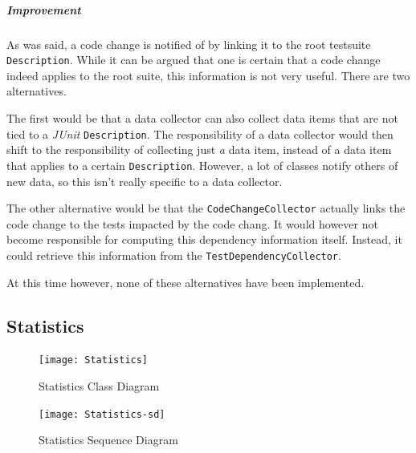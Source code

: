 \documentclass[i2]{oss}
\newcommand{\class}[1]{\texttt{#1}}
\newcommand{\junit}{\emph{JUnit }}
\begin{document}

\subparagraph{Improvement} 

As was said, a code change is notified of by linking it to the root testsuite \class{Description}.
While it can be argued that one is certain that a code change indeed applies to the root suite, this information is not very useful.
There are two alternatives.

The first would be that a data collector can also collect data items that are not tied to a \junit \class{Description}.
The responsibility of a data collector would then shift to the responsibility of collecting just \emph{a} data item, instead of a data item that applies to a certain \class{Description}.
However, a lot of classes notify others of new data, so this isn't really specific to a data collector.

The other alternative would be that the \class{CodeChangeCollector} actually links the code change to the tests impacted by the code chang.
It would however not become responsible for computing this dependency information itself.
Instead, it could retrieve this information from the \class{TestDependencyCollector}.

At this time however, none of these alternatives have been implemented.



\subsection{Statistics}
\label{subssec: statistics}

\begin{figure}[tbp]
\begin{center}
    \texttt{[image: Statistics]}
    \caption{Statistics Class Diagram}
	\label{fig:statistics}
\end{center}
\end{figure}

\begin{figure}[tbp]
\begin{center}
    \texttt{[image: Statistics-sd]}
    \caption{Statistics Sequence Diagram}
	\label{fig:statistics-sd}
\end{center}
\end{figure}
\end{document}
